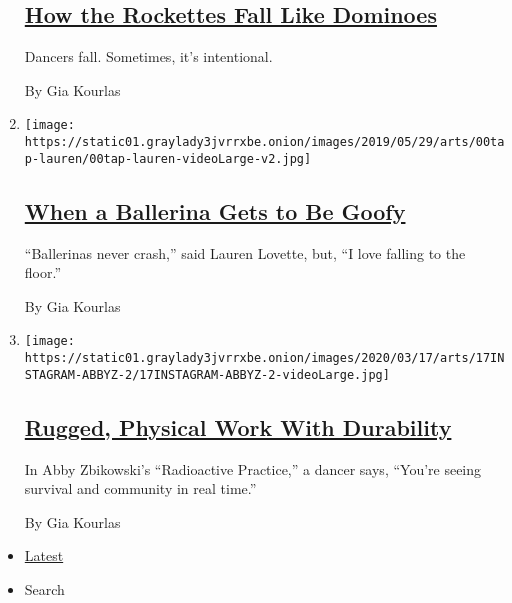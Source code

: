 \begin{enumerate}
  \hypertarget{how-the-rockettes-fall-like-dominoes}{%
  \subsection{\texorpdfstring{\href{/interactive/2019/05/30/arts/dance/speaking-in-dance-rockettes.html}{How
  the Rockettes Fall Like
  Dominoes}}{How the Rockettes Fall Like Dominoes}}\label{how-the-rockettes-fall-like-dominoes}}

  Dancers fall. Sometimes, it's intentional.

  By Gia Kourlas
\item
  \texttt{[image: https://static01.graylady3jvrrxbe.onion/images/2019/05/29/arts/00tap-lauren/00tap-lauren-videoLarge-v2.jpg]}

  \hypertarget{when-a-ballerina-gets-to-be-goofy}{%
  \subsection{\texorpdfstring{\href{/interactive/2019/05/30/arts/dance/speaking-in-dance-lauren-lovette.html}{When
  a Ballerina Gets to Be
  Goofy}}{When a Ballerina Gets to Be Goofy}}\label{when-a-ballerina-gets-to-be-goofy}}

  ``Ballerinas never crash,'' said Lauren Lovette, but, ``I love falling
  to the floor.''

  By Gia Kourlas
\item
  \texttt{[image: https://static01.graylady3jvrrxbe.onion/images/2020/03/17/arts/17INSTAGRAM-ABBYZ-2/17INSTAGRAM-ABBYZ-2-videoLarge.jpg]}

  \hypertarget{rugged-physical-work-with-durability}{%
  \subsection{\texorpdfstring{\href{/2020/03/19/arts/dance/abby-zbikowski-radioactive-practice.html}{Rugged,
  Physical Work With
  Durability}}{Rugged, Physical Work With Durability}}\label{rugged-physical-work-with-durability}}

  In Abby Zbikowski's ``Radioactive Practice,'' a dancer says, ``You're
  seeing survival and community in real time.''

  By Gia Kourlas
\end{enumerate}

\begin{itemize}
\tightlist
\item
  \protect\hyperlink{stream-panel}{Latest}
\item
  Search
\end{itemize}

